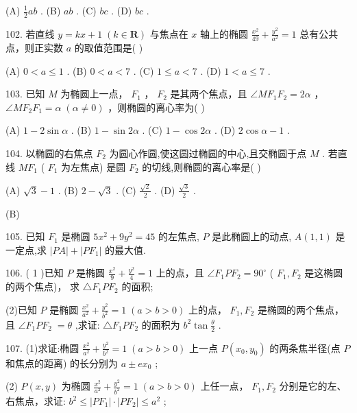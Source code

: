 \documentclass[10pt]{article}
\begin{document}
(A) \(\frac{1}{2}{ab}\) . (B) \({ab}\) . (C) \({bc}\) . (D) \({bc}\) .

102. 若直线 \(y = {kx} + 1\;\left( {k \in  \mathbf{R}}\right)\) 与焦点在 \(x\) 轴上的椭圆 \(\frac{{x}^{2}}{49} + \frac{{y}^{2}}{{a}^{2}} = 1\) 总有公共点，则正实数 \(a\) 的取值范围是( )

(A) \(0 < a \leq  1\) . (B) \(0 < a < 7\) . (C) \(1 \leq  a < 7\) . (D) \(1 < a \leq  7\) .

103. 已知 \(M\) 为椭圆上一点， \({F}_{1}\) ， \({F}_{2}\) 是其两个焦点，且 \(\angle M{F}_{1}{F}_{2} = {2\alpha }\) ， \(\angle M{F}_{2}{F}_{1} = \alpha \;\left( {\alpha  \neq  0}\right)\) ，则椭圆的离心率为( )

(A) \(1 - 2\sin \alpha\) . (B) \(1 - \sin {2\alpha }\) . (C) \(1 - \cos {2\alpha }\) . (D) \(2\cos \alpha  - 1\) .

104. 以椭圆的右焦点 \({F}_{2}\) 为圆心作圆,使这圆过椭圆的中心,且交椭圆于点 \(M\) . 若直线 \(M{F}_{1}\) ( \({F}_{1}\) 为左焦点) 是圆 \({F}_{2}\) 的切线,则椭圆的离心率是( )

(A) \(\sqrt{3} - 1\) . (B) \(2 - \sqrt{3}\) . (C) \(\frac{\sqrt{2}}{2}\) . (D) \(\frac{\sqrt{3}}{2}\) .

(B)

105. 已知 \({F}_{1}\) 是椭圆 \(5{x}^{2} + 9{y}^{2} = {45}\) 的左焦点, \(P\) 是此椭圆上的动点, \(A\left( {1,1}\right)\) 是一定点,求 \(\left| {PA}\right|  + \left| {P{F}_{1}}\right|\) 的最大值.

106. ( 1 )已知 \(P\) 是椭圆 \(\frac{{x}^{2}}{9} + \frac{{y}^{2}}{4} = 1\) 上的点，且 \(\angle {F}_{1}P{F}_{2} = {90}^{ \circ  }\) ( \({F}_{1},{F}_{2}\) 是这椭圆的两个焦点)， 求 \(\bigtriangleup {F}_{1}P{F}_{2}\) 的面积;

(2)已知 \(P\) 是椭圆 \(\frac{{x}^{2}}{{a}^{2}} + \frac{{y}^{2}}{{b}^{2}} = 1\;\left( {a > b > 0}\right)\) 上的点， \({F}_{1},{F}_{2}\) 是椭圆的两个焦点，且 \(\angle {F}_{1}P{F}_{2} \; = \theta\) ,求证: \(\bigtriangleup {F}_{1}P{F}_{2}\) 的面积为 \({b}^{2}\tan \frac{\theta }{2}\) .

107. (1)求证:椭圆 \(\frac{{x}^{2}}{{a}^{2}} + \frac{{y}^{2}}{{b}^{2}} = 1\;\left( {a > b > 0}\right)\) 上一点 \(P\left( {{x}_{0},{y}_{0}}\right)\) 的两条焦半径(点 \(P\) 和焦点的距离) 的长分别为 \(a \pm  e{x}_{0}\) ;

(2) \(P\left( {x,y}\right)\) 为椭圆 \(\frac{{x}^{2}}{{a}^{2}} + \frac{{y}^{2}}{{b}^{2}} = 1\;\left( {a > b > 0}\right)\) 上任一点， \({F}_{1},{F}_{2}\) 分别是它的左、右焦点，求证: \({b}^{2} \leq  \left| {P{F}_{1}}\right|  \cdot  \left| {P{F}_{2}}\right|  \leq  {a}^{2}\) ;
\end{document}

